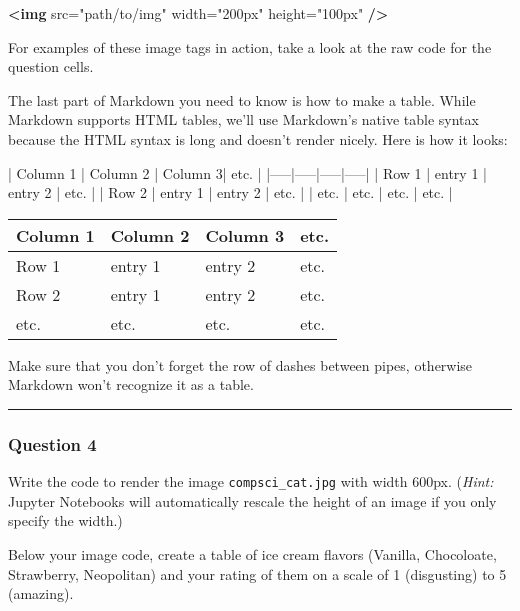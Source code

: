 \documentclass[11pt]{article}
\newenvironment{Shaded}{}{}
\newcommand{\KeywordTok}[1]{\textcolor[rgb]{0.00,0.44,0.13}{\textbf{{#1}}}}
\newcommand{\StringTok}[1]{\textcolor[rgb]{0.25,0.44,0.63}{{#1}}}
\newcommand{\OtherTok}[1]{\textcolor[rgb]{0.00,0.44,0.13}{{#1}}}
\newcommand{\NormalTok}[1]{{#1}}
\begin{document}
\begin{Shaded}
\begin{Highlighting}[]
\KeywordTok{<img}\OtherTok{ src=}\StringTok{"path/to/img"}\OtherTok{ width=}\StringTok{"200px"}\OtherTok{ height=}\StringTok{"100px"} \KeywordTok{/>}
\end{Highlighting}
\end{Shaded}

For examples of these image tags in action, take a look at the raw code
for the question cells.

The last part of Markdown you need to know is how to make a table. While
Markdown supports HTML tables, we'll use Markdown's native table syntax
because the HTML syntax is long and doesn't render nicely. Here is how
it looks:

\begin{Shaded}
\begin{Highlighting}[]
\NormalTok{| Column 1 | Column 2 | Column 3| etc. |}
\NormalTok{|-----|-----|-----|-----|}
\NormalTok{| Row 1 | entry 1 | entry 2 | etc. |}
\NormalTok{| Row 2 | entry 1 | entry 2 | etc. |}
\NormalTok{| etc. | etc. | etc. | etc. |}
\end{Highlighting}
\end{Shaded}

\begin{longtable}[]{@{}llll@{}}
\toprule
Column 1 & Column 2 & Column 3 & etc.\tabularnewline
\midrule
\endhead
Row 1 & entry 1 & entry 2 & etc.\tabularnewline
Row 2 & entry 1 & entry 2 & etc.\tabularnewline
etc. & etc. & etc. & etc.\tabularnewline
\bottomrule
\end{longtable}

Make sure that you don't forget the row of dashes between pipes,
otherwise Markdown won't recognize it as a table.

    \begin{center}\rule{0.5\linewidth}{\linethickness}\end{center}

\hypertarget{question-4}{%
\subsubsection{Question 4}\label{question-4}}

Write the code to render the image \texttt{compsci\_cat.jpg} with width
600px. (\emph{Hint:} Jupyter Notebooks will automatically rescale the
height of an image if you only specify the width.)

Below your image code, create a table of ice cream flavors (Vanilla,
Chocoloate, Strawberry, Neopolitan) and your rating of them on a scale
of 1 (disgusting) to 5 (amazing).
\end{document}
